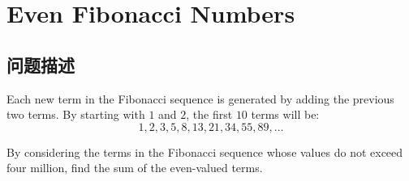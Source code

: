 \chapter{Even Fibonacci Numbers}
\section{问题描述}
\begin{tcolorbox}
Each new term in the Fibonacci sequence is generated by adding the previous two terms. By starting with $1$ and $2$, the first $10$ terms will be: $$1, 2, 3, 5, 8, 13, 21, 34, 55, 89, \dots$$

By considering the terms in the Fibonacci sequence whose values do not exceed four million, find the sum of the even-valued terms.
\end{tcolorbox}
